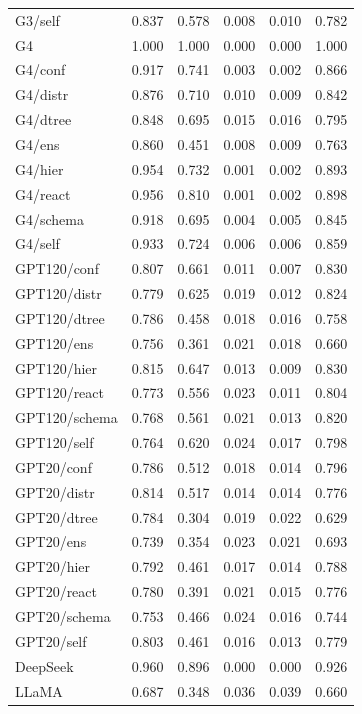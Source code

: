 \begin{table}[t]
\begin{tabular}{lrrrrr}
G3/self & 0.837 & 0.578 & 0.008 & 0.010 & 0.782 \\
G4 & 1.000 & 1.000 & 0.000 & 0.000 & 1.000 \\
G4/conf & 0.917 & 0.741 & 0.003 & 0.002 & 0.866 \\
G4/distr & 0.876 & 0.710 & 0.010 & 0.009 & 0.842 \\
G4/dtree & 0.848 & 0.695 & 0.015 & 0.016 & 0.795 \\
G4/ens & 0.860 & 0.451 & 0.008 & 0.009 & 0.763 \\
G4/hier & 0.954 & 0.732 & 0.001 & 0.002 & 0.893 \\
G4/react & 0.956 & 0.810 & 0.001 & 0.002 & 0.898 \\
G4/schema & 0.918 & 0.695 & 0.004 & 0.005 & 0.845 \\
G4/self & 0.933 & 0.724 & 0.006 & 0.006 & 0.859 \\
GPT120/conf & 0.807 & 0.661 & 0.011 & 0.007 & 0.830 \\
GPT120/distr & 0.779 & 0.625 & 0.019 & 0.012 & 0.824 \\
GPT120/dtree & 0.786 & 0.458 & 0.018 & 0.016 & 0.758 \\
GPT120/ens & 0.756 & 0.361 & 0.021 & 0.018 & 0.660 \\
GPT120/hier & 0.815 & 0.647 & 0.013 & 0.009 & 0.830 \\
GPT120/react & 0.773 & 0.556 & 0.023 & 0.011 & 0.804 \\
GPT120/schema & 0.768 & 0.561 & 0.021 & 0.013 & 0.820 \\
GPT120/self & 0.764 & 0.620 & 0.024 & 0.017 & 0.798 \\
GPT20/conf & 0.786 & 0.512 & 0.018 & 0.014 & 0.796 \\
GPT20/distr & 0.814 & 0.517 & 0.014 & 0.014 & 0.776 \\
GPT20/dtree & 0.784 & 0.304 & 0.019 & 0.022 & 0.629 \\
GPT20/ens & 0.739 & 0.354 & 0.023 & 0.021 & 0.693 \\
GPT20/hier & 0.792 & 0.461 & 0.017 & 0.014 & 0.788 \\
GPT20/react & 0.780 & 0.391 & 0.021 & 0.015 & 0.776 \\
GPT20/schema & 0.753 & 0.466 & 0.024 & 0.016 & 0.744 \\
GPT20/self & 0.803 & 0.461 & 0.016 & 0.013 & 0.779 \\
\midrule
DeepSeek & 0.960 & 0.896 & 0.000 & 0.000 & 0.926 \\
LLaMA & 0.687 & 0.348 & 0.036 & 0.039 & 0.660 \\

\end{tabular}
\end{table}
